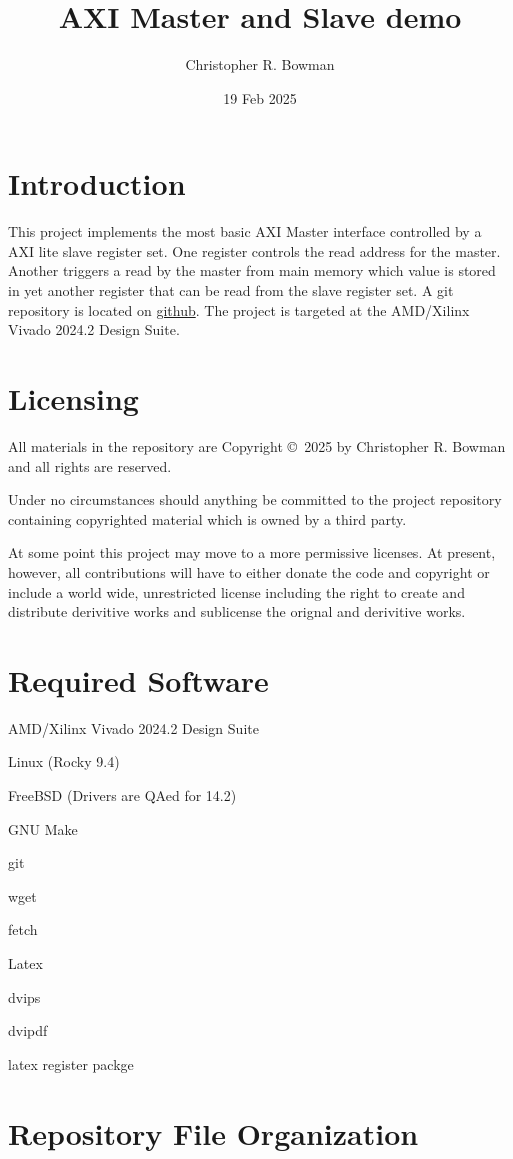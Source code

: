 \documentclass{report}
\title{AXI Master and Slave demo}
\author{Christopher R. Bowman}
\date{19 Feb 2025}
\begin{document}
\maketitle
\tableofcontents
\listoffigures
\listoftables
\pagebreak
\pagestyle{headings}
\chapter{Introduction}
This project implements the most basic AXI Master interface controlled by a
AXI lite slave register set.  One register controls the read address for the
master.  Another triggers a read by the master from main memory which value
is stored in yet another register that can be read from the slave register
set.
A git repository is located on
\href{https://gihub.com/}
{github}.
The project is targeted at the AMD/Xilinx Vivado 2024.2 Design Suite.

\chapter{Licensing}
All materials in the repository are Copyright \copyright\ 2025 by
Christopher R. Bowman and all rights are reserved.

Under no circumstances should anything be committed to the
project repository containing copyrighted material which is
owned by a third party.

At some point this project may move to a more permissive licenses.
At present, however, all contributions will have to either donate
the code and copyright or include a world wide, unrestricted
license including the right to create and distribute derivitive
works and sublicense the orignal and derivitive works.

\chapter{Required Software}
AMD/Xilinx Vivado 2024.2 Design Suite

Linux (Rocky 9.4)

FreeBSD (Drivers are QAed for 14.2)

GNU Make

git

wget

fetch

Latex

dvips

dvipdf

latex register packge

\chapter{Repository File Organization}
\end{document}
